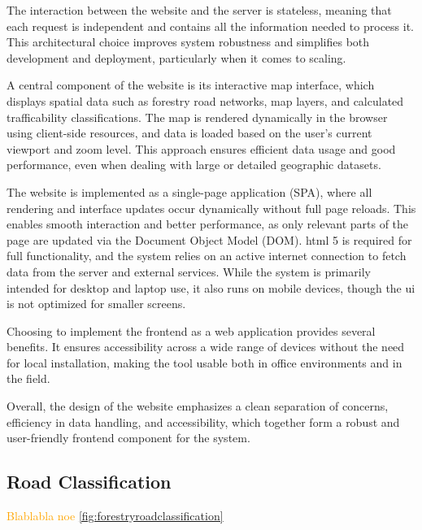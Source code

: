 The interaction between the website and the server is stateless, meaning that each request is independent and contains all the information needed to process it. This architectural choice improves system robustness and simplifies both development and deployment, particularly when it comes to scaling.

A central component of the website is its interactive map interface, which displays spatial data such as forestry road networks, map layers, and calculated trafficability classifications. The map is rendered dynamically in the browser using client-side resources, and data is loaded based on the user’s current viewport and zoom level. This approach ensures efficient data usage and good performance, even when dealing with large or detailed geographic datasets.

The website is implemented as a single-page application (SPA), where all rendering and interface updates occur dynamically without full page reloads. This enables smooth interaction and better performance, as only relevant parts of the page are updated via the Document Object Model (DOM). \acrshort{html} 5 is required for full functionality, and the system relies on an active internet connection to fetch data from the server and external services. While the system is primarily intended for desktop and laptop use, it also runs on mobile devices, though the \acrshort{ui} is not optimized for smaller screens.

Choosing to implement the frontend as a web application provides several benefits. It ensures accessibility across a wide range of devices without the need for local installation, making the tool usable both in office environments and in the field.

Overall, the design of the website emphasizes a clean separation of concerns, efficiency in data handling, and accessibility, which together form a robust and user-friendly frontend component for the system.

\subsection{Road Classification}

\textcolor{orange}{
Blablabla noe \autoref{fig:forestryroadclassification}
}

